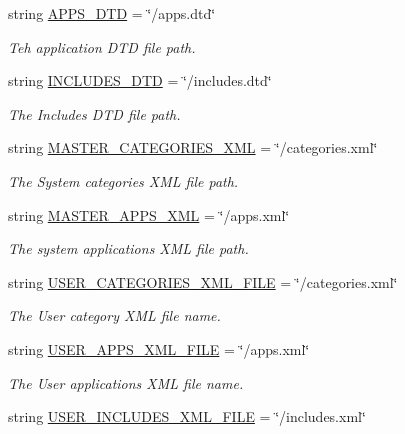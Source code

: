 \begin{CompactItemize}
string \hyperlink{namespaceweb__winsol_83be49c783105f474efdcf2e83370b85}{APPS\_\-DTD} = \char`\"{}/apps.dtd\char`\"{}
\begin{CompactList}\small\item\em Teh application DTD file path. \item\end{CompactList}\item 
string \hyperlink{namespaceweb__winsol_85237de6fb02ee9c3fdd831318d9c73f}{INCLUDES\_\-DTD} = \char`\"{}/includes.dtd\char`\"{}
\begin{CompactList}\small\item\em The Includes DTD file path. \item\end{CompactList}\item 
string \hyperlink{namespaceweb__winsol_72297e3ebe0d8bb41b3b8e534fa2077f}{MASTER\_\-CATEGORIES\_\-XML} = \char`\"{}/categories.xml\char`\"{}
\begin{CompactList}\small\item\em The System categories XML file path. \item\end{CompactList}\item 
string \hyperlink{namespaceweb__winsol_5e9abe539d73e85151a06da686d011fd}{MASTER\_\-APPS\_\-XML} = \char`\"{}/apps.xml\char`\"{}
\begin{CompactList}\small\item\em The system applications XML file path. \item\end{CompactList}\item 
string \hyperlink{namespaceweb__winsol_f819cf1d0612321433c03f21507d9b18}{USER\_\-CATEGORIES\_\-XML\_\-FILE} = \char`\"{}/categories.xml\char`\"{}
\begin{CompactList}\small\item\em The User category XML file name. \item\end{CompactList}\item 
string \hyperlink{namespaceweb__winsol_511aeb82672612c294251d44ca2f772c}{USER\_\-APPS\_\-XML\_\-FILE} = \char`\"{}/apps.xml\char`\"{}
\begin{CompactList}\small\item\em The User applications XML file name. \item\end{CompactList}\item 
string \hyperlink{namespaceweb__winsol_e8acc57c07acda4120cd31fcba0855f9}{USER\_\-INCLUDES\_\-XML\_\-FILE} = \char`\"{}/includes.xml\char`\"{}

\end{CompactItemize}
